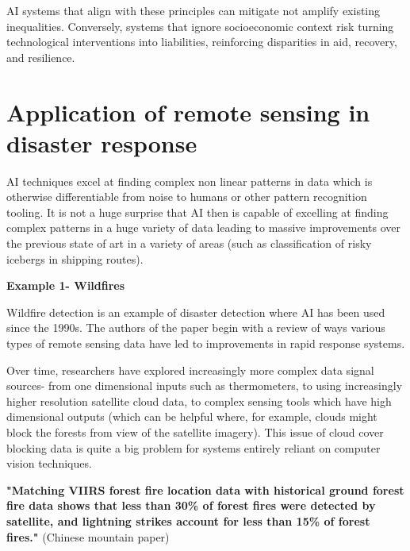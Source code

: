 \documentclass[conference,a4paper]{IEEEtran}
\begin{document}
AI systems that align with these principles can mitigate not amplify existing inequalities. Conversely, systems that ignore socioeconomic context risk turning technological interventions into liabilities, reinforcing disparities in aid, recovery, and resilience.


\section{Application of remote sensing in disaster response}


AI techniques excel at finding complex non linear patterns in data which is otherwise differentiable from noise to humans or other pattern recognition tooling. It is not a huge surprise that AI then is capable of excelling at finding complex patterns in a huge variety of data leading to massive improvements over the previous state of art in a variety of areas (such as classification of risky icebergs in shipping routes).

\textbf{Example 1- Wildfires}

Wildfire detection is an example of disaster detection where AI has been used since the 1990s. The authors of the paper begin with a review of ways various types of remote sensing data have led to improvements in rapid response systems. 

Over time, researchers have explored increasingly more complex data signal sources- from one dimensional inputs such as thermometers, to using increasingly higher resolution satellite cloud data, to complex sensing tools which have high dimensional outputs (which can be helpful where, for example, clouds might block the forests from view of the satellite imagery). This issue of cloud cover blocking data is quite a big problem for systems entirely reliant on computer vision techniques. 

\textbf{"Matching VIIRS forest fire location data with historical ground forest fire data shows that less than 30\% of forest fires were detected by satellite, and lightning strikes account for less than 15\% of forest fires."}
(Chinese mountain paper)
\end{document}
